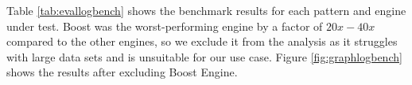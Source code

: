 {\renewcommand{\arraystretch}{1.2}%
\begin{table}[H]
\centering
\small
{}
\caption{Patterns Used in Log Benchmark and Number of Matches.}\label{tab:pattlogbench}
\end{table}
}

Table \ref{tab:evallogbench} shows the benchmark results for each pattern and engine under test. Boost was the worst-performing engine by a factor of $20x-40x$ compared to the other engines, so we exclude it from the analysis as it struggles with large data sets and is unsuitable for our use case. Figure \ref{fig:graphlogbench} shows the results after excluding Boost Engine.

